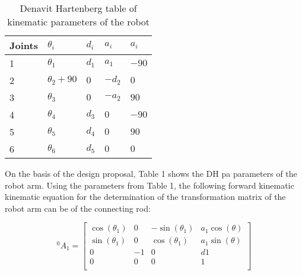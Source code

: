 \begin{table}[H]
	\caption{Denavit Hartenberg table of kinematic parameters of the robot}\label{tab:DH}
	\centering
	\setlength{\tabcolsep}{18pt}
	\begin{tabular}{lllll}
	\hline 
	Joints & $\theta_i$ 	& $d_i$ & $a_i$ & $a_i$ \\ \hline
	1      & $\theta_1$ 	& $d_1$ & $a_1$ & $-90 $ \\
	2      & $\theta_2+90$  & $0  $ & $-d_2$ & $0   $ \\
	3      & $\theta_3$ 	& $0  $ & $-a_2  $ & $90  $ \\
	4      & $\theta_4$ 	& $d_3$ & $0  $ & $-90  $ \\
	5      & $\theta_5$ 	& $d_4$ & $0  $ & $90  $ \\
	6      & $\theta_6$ 	& $d_5$ & $0  $ & $0   $ \\ \hline
	\end{tabular}

	\end{table}


	On the basis of the design proposal, Table 1 shows the DH pa
parameters of the robot arm.
Using the parameters from Table 1, the following forward kinematic
kinematic equation for the determination of the transformation matrix of the robot arm can be
of the connecting rod:

\[
	{}^{0}_{}A_1 = \begin{bmatrix}
	\cos(\theta_1)& 0& -\sin(\theta_1)  & a_1\cos(\theta) \\
	\sin(\theta_1)& 0 & \cos(\theta_1) & a_1\sin(\theta) \\
	0 & -1 & 0 & d1 \\
	0 & 0 & 0 & 1 \\
\end{bmatrix}
\]